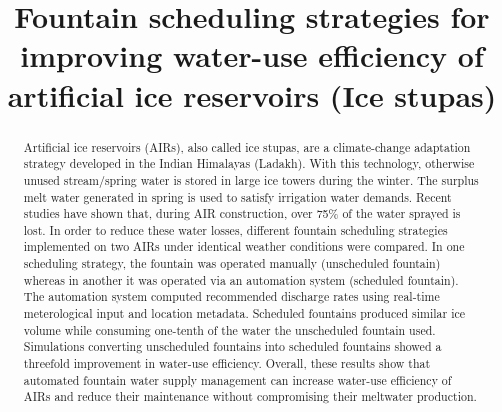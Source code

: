 \documentclass[tc, manuscript]{copernicus}
\begin{document}
\title{Fountain scheduling strategies for improving water-use efficiency of artificial ice reservoirs (Ice stupas)}

\def\Authors{Suryanarayanan Balasubramanian\,$^{1,2}$, Martin Hoelzle\,$^{1}$Roger Waser\,$^{3}$}

\def\Address{$^{1}$University of Fribourg, Department of Geosciences, Fribourg, Switzerland $^{2}$University of
Applied Sciences and Arts, Luzern, Switzerland} \def\corrAuthor{Suryanarayanan Balasubramanian}





\maketitle

\begin{abstract}

  Artificial ice reservoirs (AIRs), also called ice stupas, are a climate-change adaptation strategy developed
  in the Indian Himalayas (Ladakh). With this technology, otherwise unused stream/spring water is stored in
  large ice towers during the winter. The surplus melt water generated in spring is used to satisfy irrigation
  water demands. Recent studies have shown that, during AIR construction, over 75\% of the water sprayed is
  lost. In order to reduce these water losses, different fountain scheduling strategies implemented on two AIRs
  under identical weather conditions were compared. In one scheduling strategy, the fountain was operated
  manually (unscheduled fountain) whereas in another it was operated via an automation system (scheduled
  fountain). The automation system computed recommended discharge rates using real-time meterological input and
  location metadata. Scheduled fountains produced similar ice volume while consuming one-tenth of the water the
  unscheduled fountain used. Simulations converting unscheduled fountains into scheduled fountains showed a
  threefold improvement in water-use efficiency. Overall, these results show that automated fountain water
  supply management can increase water-use efficiency of AIRs and reduce their maintenance without compromising
  their meltwater production.

\end{abstract}
\end{document}
